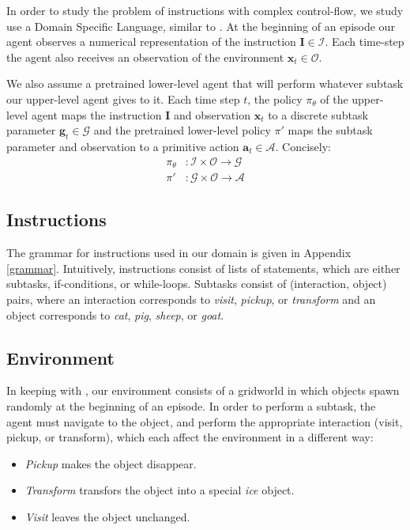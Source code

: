 \documentclass{article}
\begin{document}
In order to study the problem of instructions with complex control-flow, we
study use a Domain Specific Language, similar to \cite{sun2020program}.
At the beginning of an episode our agent observes a numerical representation of
the instruction $\mathbf{I} \in\mathcal{I}$. Each time-step the agent also receives an observation of the
environment $\mathbf{x}_t \in\mathcal{O}$. 

We also assume a pretrained lower-level agent that will perform whatever subtask our
upper-level agent gives to it. Each time step $t$, the policy $\pi_\theta$ of the upper-level agent
maps the instruction
$\mathbf{I}$ and
observation $\mathbf{x}_t$ to a discrete subtask parameter
$\mathbf{g}_t \in\mathcal{G}$ and the
pretrained lower-level policy $\pi'$ maps the subtask parameter and observation to
a primitive action $\mathbf{a}_t \in \mathcal{A}$. Concisely:
\begin{align}
  \pi_\theta&: \mathcal{I} \times \mathcal{O} \to \mathcal{G} \\
  \pi'&: \mathcal{G} \times \mathcal{O} \to \mathcal{A}
\end{align}

\subsection{Instructions}
The grammar for instructions used in our domain is given in Appendix
\ref{grammar}.
Intuitively, instructions consist of lists of statements, which are either subtasks,
if-conditions, or while-loops. Subtasks consist of (interaction, object) pairs,
where an interaction corresponds to \textit{visit}, \textit{pickup}, or
\textit{transform} and an object corresponds to \textit{cat}, \textit{pig},
\textit{sheep}, or \textit{goat}.

\subsection{Environment}
In keeping with \cite{oh2017zero}, our environment consists of a gridworld in which
objects spawn randomly at the beginning of an episode. In order to perform a
subtask, the agent must navigate to the object, and perform the appropriate
interaction (visit, pickup, or transform), which each affect the environment in
a different way:
\begin{itemize}
  \item \textit{Pickup} makes the object disappear. 
  \item \textit{Transform} transfors the object into a special \textit{ice}
    object.
  \item \textit{Visit} leaves the object unchanged.
\end{itemize}
\end{document}
